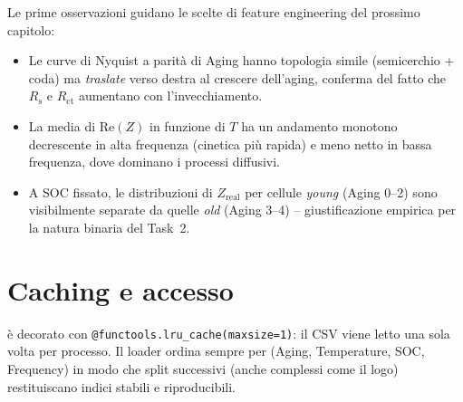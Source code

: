Le prime osservazioni guidano le scelte di feature engineering del
prossimo capitolo:
\begin{itemize}
  \item Le curve di Nyquist a parità di Aging hanno topologia simile
        (semicerchio + coda) ma \emph{traslate} verso destra al crescere
        dell'aging, conferma del fatto che $R_\mathrm{s}$ e
        $R_\mathrm{ct}$ aumentano con l'invecchiamento.
  \item La media di $\mathrm{Re}(Z)$ in funzione di $T$ ha un andamento
        monotono decrescente in alta frequenza (cinetica più rapida) e
        meno netto in bassa frequenza, dove dominano i processi
        diffusivi.
  \item A SOC fissato, le distribuzioni di $Z_\text{real}$ per cellule
        \emph{young} (Aging 0--2) sono visibilmente separate da quelle
        \emph{old} (Aging 3--4) -- giustificazione empirica per la natura
        binaria del Task~2.
\end{itemize}

\section{Caching e accesso}

 è decorato con
\texttt{@functools.lru\_cache(maxsize=1)}: il CSV viene letto una sola
volta per processo. Il loader ordina sempre per (Aging, \newline Temperature, 
SOC, Frequency) in modo che split successivi (anche complessi come il
\acrshort{logo}) restituiscano indici stabili e riproducibili.
